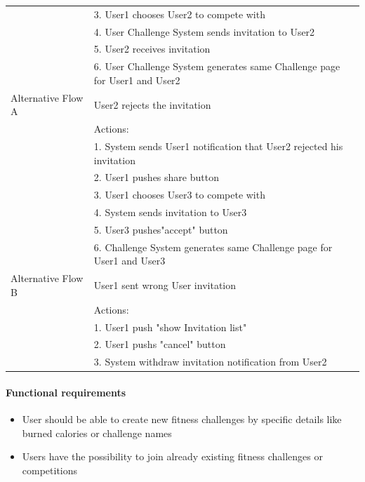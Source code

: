 \documentclass{article}
\begin{document}
\begin{table}[h!]
\begin{tabularx}{\textwidth}{|>{\raggedright\arraybackslash}p{}|X|}
                         & 3. User1 chooses User2 to compete with\\
                         & 4. User Challenge System sends invitation to User2 \\
                         & 5. User2 receives invitation\\
                         & 6. User Challenge System generates same Challenge page for User1 and User2 \\ \hline
        Alternative Flow A & User2 rejects the invitation\\
                         & Actions: \\
                         & 1. System sends User1 notification that User2 rejected his invitation \\
                         & 2. User1 pushes share button \\
                         & 3. User1 chooses User3 to compete with\\
                         & 4. System sends invitation to User3 \\
                         & 5. User3 pushes"accept" button \\
                         & 6. Challenge System generates same Challenge page for User1 and User3 \\ \hline
        Alternative Flow B & User1 sent wrong User invitation \\
                         & Actions: \\
                         & 1. User1 push "show Invitation list" \\
                         & 2. User1 pushs "cancel" button \\
                         & 3. System withdraw invitation notification from User2\\ \hline
    \end{tabularx}
\end{table}

\paragraph{Functional requirements}
		\begin{itemize}
			\item  User should be able to create new fitness challenges by specific details like burned calories or
			challenge names
			\item  Users have the possibility to join already existing fitness challenges or competitions
		\end{itemize}
		
\end{document}
